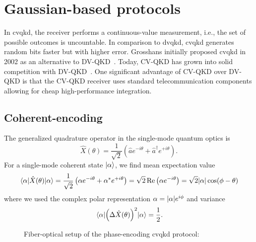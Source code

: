 \section{Gaussian-based protocols}

In \gls{cvqkd}, the receiver performs a continuous-value measurement, i.e., the set of possible outcomes is uncountable.
In comparison to \gls{dvqkd}, \gls{cvqkd} generates random bits faster but with higher error.
Grosshans initially proposed \gls{cvqkd} in 2002 as an alternative to DV-QKD~\cite{Grosshans2002}.
Today, CV-QKD has grown into solid competition with DV-QKD~\cite{Diamanti2016}.
One significant advantage of CV-QKD over DV-QKD is that the CV-QKD receiver uses standard telecommunication components allowing for cheap high-performance integration.

\subsection{Coherent-encoding}

The generalized quadrature operator in the single-mode quantum optics is~\cite[p.~36]{Barnett2002}
\begin{equation}
	\hat{X}(\theta)
	=
	\frac{1}{\sqrt{2}}
	\left(
		\hat{a}
		e^{-i\theta}
		+
		\hat{a}^\dagger
		e^{+i\theta}
	\right)
	.
\end{equation}
For a single-mode coherent state $\ket{\alpha}$, we find mean expectation value
\begin{equation}
	\expval{\hat{X}(\theta)}{\alpha}
	=
	\frac{1}{\sqrt{2}}
	\left(
		\alpha
		e^{-i\theta}
		+
		\alpha^*
		e^{+i\theta}
	\right)
	=
	\sqrt{2}
	\operatorname{\operatorname{Re}}\left(
		\alpha
		e^{-i\theta}
	\right)
	=
	\sqrt{2}
	\abs{\alpha}
	\cos(\phi-\theta)
\end{equation}
where we used the complex polar representation $\alpha=\abs{\alpha}e^{i\phi}$ and variance~\cite[p.~59]{Barnett2002}
\begin{equation}
	\expval{\left(\Delta\hat{X}(\theta)\right)^2}{\alpha}
	=
	\frac{1}{2}
	.
\end{equation}

\begin{figure}[htb]
	\centering
	
	\caption{Fiber-optical setup of the phase-encoding \gls{cvqkd} protocol:}
\end{figure}



